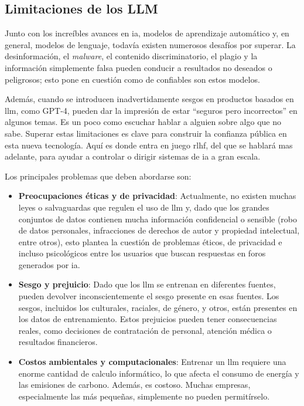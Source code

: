 \subsection{Limitaciones de los LLM}

Junto con los increíbles avances en \acrlong{ia}, modelos de aprendizaje automático y, en general, modelos de lenguaje, todavía existen numerosos desafíos por superar. La desinformación, el \textit{malware}, el contenido discriminatorio, el plagio y la información simplemente falsa pueden conducir a resultados no deseados o peligrosos; esto pone en cuestión como de confiables son estos modelos.

Además, cuando se introducen inadvertidamente sesgos en productos basados en \acrshort{llm}, como GPT-4, pueden dar la impresión de estar ``seguros pero incorrectos'' en algunos temas. Es un poco como escuchar hablar a alguien sobre algo que no sabe. Superar estas limitaciones es clave para construir la confianza pública en esta nueva tecnología. Aquí es donde entra en juego \acrshort{rlhf}, del que se hablará mas adelante, para ayudar a controlar o dirigir sistemas de \acrlong{ia} a gran escala.

Los principales problemas que deben abordarse son:

\begin{itemize}  

\item \textbf{Preocupaciones éticas y de privacidad}: Actualmente, no existen muchas leyes o salvaguardas que regulen el uso de \acrshort{llm} y, dado que los grandes conjuntos de datos contienen mucha información confidencial o sensible (robo de datos personales, infracciones de derechos de autor y propiedad intelectual, entre otros), esto plantea la cuestión de problemas éticos, de privacidad e incluso psicológicos entre los usuarios que buscan respuestas en foros generados por \acrlong{ia}.

\item \textbf{Sesgo y prejuicio}: Dado que los \acrshort{llm} se entrenan en diferentes fuentes, pueden devolver inconscientemente el sesgo presente en esas fuentes. Los sesgos, incluidos los culturales, raciales, de género, y otros, están presentes en los datos de entrenamiento. Estos prejuicios pueden tener consecuencias reales, como decisiones de contratación de personal, atención médica o resultados financieros.

\item \textbf{Costos ambientales y computacionales}: Entrenar un \acrlong{llm} requiere una enorme cantidad de calculo informático, lo que afecta el consumo de energía y las emisiones de carbono. Además, es costoso. Muchas empresas, especialmente las más pequeñas, simplemente no pueden permitírselo.
\end{itemize}

